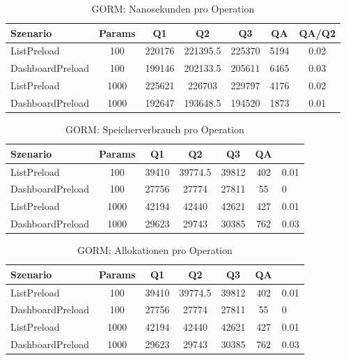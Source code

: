 
\begin{table}[ht]
\centering
\caption{GORM: Nanosekunden pro Operation}
\begin{tabular}{lcccccc}
\toprule
Szenario & Params & Q1 & Q2 & Q3 & QA & QA/Q2 \\
\midrule
	ListPreload & 100 & 220176 & 221395.5 & 225370 & 5194 & 0.02 \\
	DashboardPreload & 100 & 199146 & 202133.5 & 205611 & 6465 & 0.03 \\
	ListPreload & 1000 & 225621 & 226703 & 229797 & 4176 & 0.02 \\
	DashboardPreload & 1000 & 192647 & 193648.5 & 194520 & 1873 & 0.01 \\
\bottomrule
\end{tabular}
\label{tab:benchmark_gorm_nsperop}
\end{table}
	
\begin{table}[ht]
\centering
\caption{GORM: Speicherverbrauch pro Operation}
\begin{tabular}{lccccc}
\toprule
Szenario & Params & Q1 & Q2 & Q3 & QA \\
\midrule
	ListPreload & 100 & 39410 & 39774.5 & 39812 & 402 & 0.01 \\
	DashboardPreload & 100 & 27756 & 27774 & 27811 & 55 & 0 \\
	ListPreload & 1000 & 42194 & 42440 & 42621 & 427 & 0.01 \\
	DashboardPreload & 1000 & 29623 & 29743 & 30385 & 762 & 0.03 \\
\bottomrule
\end{tabular}
\label{tab:benchmark_gorm_bytesperop}
\end{table}
	
\begin{table}[ht]
\centering
\caption{GORM: Allokationen pro Operation}
\begin{tabular}{lccccc}
\toprule
Szenario & Params & Q1 & Q2 & Q3 & QA \\
\midrule
	ListPreload & 100 & 39410 & 39774.5 & 39812 & 402 & 0.01 \\
	DashboardPreload & 100 & 27756 & 27774 & 27811 & 55 & 0 \\
	ListPreload & 1000 & 42194 & 42440 & 42621 & 427 & 0.01 \\
	DashboardPreload & 1000 & 29623 & 29743 & 30385 & 762 & 0.03 \\
\bottomrule
\end{tabular}
\label{tab:benchmark_gorm_allocsperop}
\end{table}
	